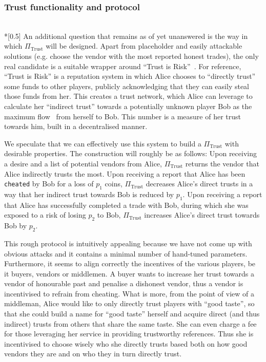 \subsubsection{Trust functionality and protocol} \ \\*[0.5\baselineskip]
  An additional question that remains as of yet unanswered is the way in which
  $\Pi_{\mathrm{Trust}}$ will be designed. Apart from placeholder and easily attackable
  solutions (e.g. choose the vendor with the most reported honest trades), the only real
  candidate is a suitable wrapper around ``Trust is Risk''~\cite{trustisrisk}. For
  reference, ``Trust is Risk'' is a reputation system in which Alice chooses to ``directly
  trust'' some funds to other players, publicly acknowledging that they can easily steal
  those funds from her. This creates a trust network, which Alice can leverage to
  calculate her ``indirect trust'' towards a potentially unknown player Bob as the maximum
  flow~\cite{maxflownm} from herself to Bob. This number is a measure of her trust towards
  him, built in a decentralised manner.

  We speculate that we can effectively use this system to build a $\Pi_{\mathrm{Trust}}$
  with desirable properties. The construction will roughly be as follows: Upon receiving a
  desire and a list of potential vendors from Alice, $\Pi_{\mathrm{Trust}}$ returns the
  vendor that Alice indirectly trusts the most. Upon receiving a report that Alice has
  been \texttt{cheated} by Bob for a loss of $p_1$ coins, $\Pi_{\mathrm{Trust}}$ decreases
  Alice's direct trusts in a way that her indirect trust towards Bob is reduced by $p_1$.
  Upon receiving a report that Alice has successfully completed a trade with Bob, during
  which she was exposed to a risk of losing $p_2$ to Bob, $\Pi_{\mathrm{Trust}}$ increases
  Alice's direct trust towards Bob by $p_2$.

  This rough protocol is intuitively appealing because we have not come up with obvious
  attacks and it contains a minimal number of hand-tuned parameters. Furthermore, it seems
  to align correctly the incentives of the various players, be it buyers, vendors or
  middlemen. A buyer wants to increase her trust towards a vendor of honourable past and
  penalise a dishonest vendor, thus a vendor is incentivised to refrain from cheating.
  What is more, from the point of view of a middleman, Alice would like to only directly
  trust players with ``good taste'', so that she could build a name for ``good taste''
  herself and acquire direct (and thus indirect) trusts from others that share the same
  taste. She can even charge a fee for those leveraging her service in providing
  trustworthy references. Thus she is incentivised to choose wisely who she directly
  trusts based both on how good vendors they are and on who they in turn directly trust.

